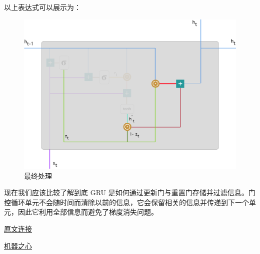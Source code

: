 \documentclass{article}
\begin{document}
以上表达式可以展示为：

\begin{figure}[H]
	\centering
	\includegraphics[scale=0.2]{GRU7.png}
	\caption{最终处理}
\end{figure}
现在我们应该比较了解到底 GRU 是如何通过更新门与重置门存储并过滤信息。门控循环单元不会随时间而清除以前的信息，它会保留相关的信息并传递到下一个单元，因此它利用全部信息而避免了梯度消失问题。

\href{https://towardsdatascience.com/understanding-gru-networks-2ef37df6c9be}{原文连接}

\href{http://mp.weixin.qq.com/s?__biz=MzA3MzI4MjgzMw==&mid=2650735126&idx=2&sn=9c56d9f6a4fff5f6e1d026d8c98b21c7&chksm=871ac668b06d4f7ece3109204cc5eba8ae099a7e64a42fce284e239ef2b68aba64a06407020c&mpshare=}{机器之心}
\end{document}
